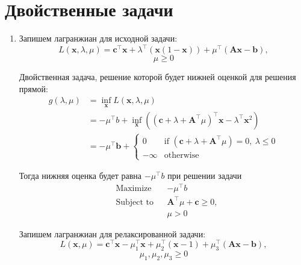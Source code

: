 \documentclass{article}
\begin{document}
\section{Двойственные задачи}

\begin{enumerate}
	\item Запишем лагранжиан для исходной задачи:
	      \[
		      L(\mathbf{x}, \lambda, \mu) = \mathbf{c}^\top \mathbf{x}
		      + \lambda^\top (\mathbf{x}(1 - \mathbf{x}))
		      + \mu^\top (\mathbf{Ax} - \mathbf{b}),
	      \]
	      \[
		      \mu \geq 0
	      \]

	      Двойственная задача, решение которой будет нижней
	      оценкой для решения прямой:
	      \begin{align*}
		      g(\lambda, \mu) & = \inf_{\mathbf{x}} L(\mathbf{x}, \lambda, \mu) \\
		                      & = -\mu^\top b +
		      \inf_{\mathbf{x}}
		      \left( {(\mathbf{c} + \lambda +
					      \mathbf{A}^\top \mu)}^\top \mathbf{x} -
		      \lambda^\top \mathbf{x}^2 \right)                                 \\
		                      & = -\mu^\top \mathbf{b} +
		      \begin{cases}
			      0       & \text{if } (\mathbf{c} + \lambda +
			      \mathbf{A}^\top \mu) = 0, \ \lambda \leq 0   \\
			      -\infty & \text{otherwise}
		      \end{cases}
	      \end{align*}

	      Тогда нижняя оценка будет равна $-\mu^\top b$
	      при решении задачи
	      \begin{equation*}
		      \begin{aligned}
			       & \text{Maximize}   &  & -\mu^\top b                              \\
			       & \text{Subject to} &  & \mathbf{A}^\top \mu + \mathbf{c} \geq 0, \\
			       &                   &  & \mu > 0
		      \end{aligned}
	      \end{equation*}

	      Запишем лагранжиан для релаксированной задачи:
	      \[
		      L(\mathbf{x}, \mu) = \mathbf{c}^\top \mathbf{x}
		      - \mu_1^\top \mathbf{x}
		      + \mu_2^\top (\mathbf{x} - 1)
		      + \mu_3^\top (\mathbf{Ax} - \mathbf{b}),
	      \]
	      \[
		      \mu_1, \mu_2, \mu_3 \geq 0
	      \]


\end{enumerate}
\end{document}

